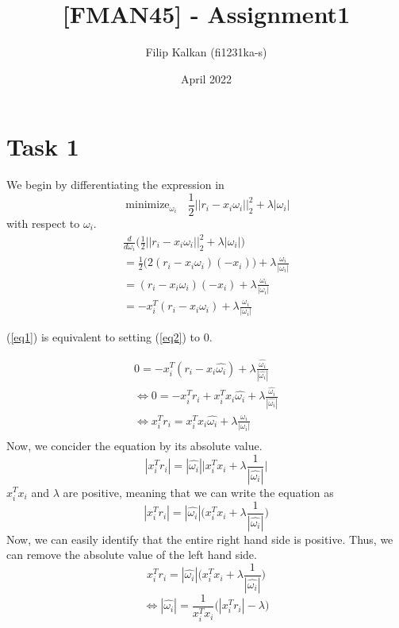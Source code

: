 \documentclass{article}
\title{[FMAN45] - Assignment1}
\author{Filip Kalkan (fi1231ka-s) }
\date{April 2022}
\DeclareMathOperator*{\minimize}{minimize}
\begin{document}
\maketitle

\section{Task 1}
We begin by differentiating the expression in
\begin{equation} \label{eq1}
    \displaystyle{\minimize_{\omega_i}}\text{ } \frac{1}{2} ||r_i - x_i \omega_i||_2^2 + \lambda|\omega_i|
\end{equation}
with respect to $\omega_i$.
\begin{equation} \label{eq2}
\begin{split}
\frac{d}{d\omega_i} \bigg(\frac{1}{2} ||r_i - x_i \omega_i||_2^2 + \lambda|\omega_i|\bigg) \\
 = \frac{1}{2} \bigg( 2(r_i - x_i\omega_i)(-x_i)\bigg) + \lambda \frac{\omega_i}{|\omega_i|} \\
 = (r_i-x_i\omega_i)(-x_i) + \lambda \frac{\omega_i}{|\omega_i|} \\
 = -x^T_i(r_i - x_i\omega_i) + \lambda \frac{\omega_i}{|\omega_i|}
\end{split}
\end{equation}

(\ref{eq1}) is equivalent to setting (\ref{eq2}) to 0.

\begin{equation} \label{eq3}
\begin{split}
0 = -x^T_i(r_i - x_i\hat{\omega_i}) + \lambda \frac{\hat{\omega_i}}{|\hat{\omega_i}|} \\
\Longleftrightarrow 0 = -x_i^Tr_i + x_i^Tx_i\hat{\omega_i} + \lambda \frac{\hat{\omega_i}}{|\hat{\omega_i}|} \\
\Longleftrightarrow x_i^Tr_i = x_i^Tx_i\hat{\omega_i} + \lambda \frac{\omega_i}{|\omega_i|} \\
\end{split}
\end{equation}
Now, we concider the equation by its absolute value.
\begin{equation}
|x_i^Tr_i| = |\hat{\omega_i}|\bigg|x_i^Tx_i + \lambda \frac{1}{|\hat{\omega_i}|}\bigg|
\end{equation}
$x_i^T x_i$ and $\lambda$ are positive, meaning that we can write the equation as
\begin{equation}
    |x_i^Tr_i| = |\hat{\omega_i}|\bigg(x_i^Tx_i + \lambda \frac{1}{|\hat{\omega_i}|}\bigg)
\end{equation}
Now, we can easily identify that the entire right hand side is positive. Thus, we can remove the absolute value of the left hand side.
\begin{equation}
    x_i^Tr_i = |\hat{\omega_i}|\bigg(x_i^T x_i + \lambda \frac{1}{|\hat{\omega_i}|}\bigg)
\end{equation}
\begin{equation} \label{eq7}
    \Longleftrightarrow |\hat{\omega_i}| = \frac{1}{x_i^T x_i}\bigg(|x_i^T r_i| - \lambda\bigg)
\end{equation}
\end{document}
